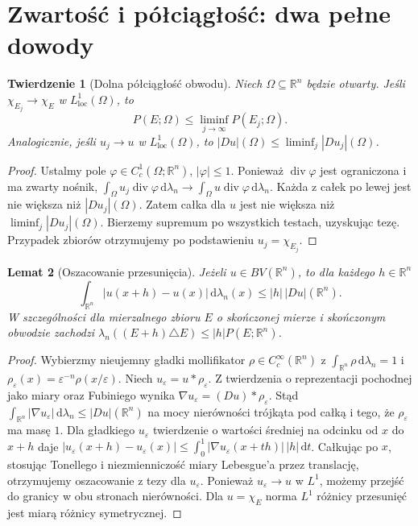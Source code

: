 \documentclass[11pt,a4paper,oneside]{book}
\numberwithin{equation}{chapter}
\theoremstyle{plain}
\newtheorem{twierdzenie}{Twierdzenie}[chapter]
\newtheorem{lemat}[twierdzenie]{Lemat}
\theoremstyle{definition}
\theoremstyle{remark}
\begin{document}
\section{Zwartość i półciągłość: dwa pełne dowody}
\begin{twierdzenie}[Dolna półciągłość obwodu]
\label{thm:perimeter-lsc-29}
Niech $\Omega\subseteq\mathbb R^n$ będzie otwarty.
Jeśli $\chi_{E_j}\to\chi_E$ w
$L^1_{\mathrm{loc}}(\Omega)$, to
\[
 P(E;\Omega)\le\liminf_{j\to\infty}P(E_j;\Omega).
\]
Analogicznie, jeśli $u_j\to u$ w
$L^1_{\mathrm{loc}}(\Omega)$, to
$|Du|(\Omega)\le\liminf_j|Du_j|(\Omega)$.
\end{twierdzenie}
\begin{proof}
Ustalmy pole $\varphi\in C_c^1(\Omega;\mathbb R^n)$,
$|\varphi|\le1$. Ponieważ $\operatorname{div}\varphi$
jest ograniczona i ma zwarty nośnik,
$\int_\Omega u_j\operatorname{div}\varphi
\,\mathrm d\lambda_n\to\int_\Omega u\operatorname{div}\varphi
\,\mathrm d\lambda_n$.
Każda z całek po lewej jest nie większa niż
$|Du_j|(\Omega)$. Zatem całka dla $u$
jest nie większa niż $\liminf_j|Du_j|(\Omega)$.
Bierzemy supremum po wszystkich testach,
uzyskując tezę. Przypadek zbiorów otrzymujemy
po podstawieniu $u_j=\chi_{E_j}$.
\end{proof}

\begin{lemat}[Oszacowanie przesunięcia]
\label{lem:BV-translation-29}
Jeżeli $u\in BV(\mathbb R^n)$, to dla każdego
$h\in\mathbb R^n$
\[
 \int_{\mathbb R^n}|u(x+h)-u(x)|
 \,\mathrm d\lambda_n(x)\le|h|\,|Du|(\mathbb R^n).
\]
W szczególności dla mierzalnego zbioru $E$ o
skończonej mierze i skończonym obwodzie zachodzi
$\lambda_n((E+h)\triangle E)\le|h|P(E;\mathbb R^n)$.
\end{lemat}
\begin{proof}
Wybierzmy nieujemny gładki mollifikator
$\rho\in C_c^\infty(\mathbb R^n)$ z
$\int_{\mathbb R^n}\rho\,\mathrm d\lambda_n=1$ i
$\rho_\varepsilon(x)=\varepsilon^{-n}\rho(x/\varepsilon)$.
Niech $u_\varepsilon=u*\rho_\varepsilon$.
Z twierdzenia o reprezentacji pochodnej jako miary
oraz Fubiniego wynika
$\nabla u_\varepsilon=(Du)*\rho_\varepsilon$.
Stąd
$\int_{\mathbb R^n}|\nabla u_\varepsilon|\,\mathrm d\lambda_n
\le|Du|(\mathbb R^n)$ na mocy nierówności trójkąta
pod całką i tego, że $\rho_\varepsilon$ ma masę $1$.
Dla gładkiego $u_\varepsilon$ twierdzenie o wartości
średniej na odcinku od $x$ do $x+h$ daje
$|u_\varepsilon(x+h)-u_\varepsilon(x)|
\le\int_0^1|\nabla u_\varepsilon(x+th)|\,|h|\,\mathrm dt$.
Całkując po $x$, stosując Tonellego i niezmienniczość
miary Lebesgue'a przez translację, otrzymujemy
oszacowanie z tezy dla $u_\varepsilon$.
Ponieważ $u_\varepsilon\to u$ w $L^1$,
możemy przejść do granicy w obu stronach nierówności.
Dla $u=\chi_E$ norma $L^1$ różnicy przesunięć
jest miarą różnicy symetrycznej.
\end{proof}
\end{document}
